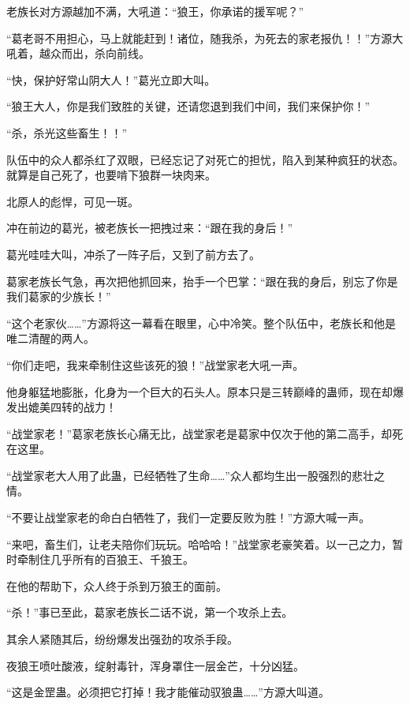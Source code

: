 
\begin{this_body}

老族长对方源越加不满，大吼道：“狼王，你承诺的援军呢？”

“葛老哥不用担心，马上就能赶到！诸位，随我杀，为死去的家老报仇！！”方源大吼着，越众而出，杀向前线。

“快，保护好常山阴大人！”葛光立即大叫。

“狼王大人，你是我们致胜的关键，还请您退到我们中间，我们来保护你！”

“杀，杀光这些畜生！！”

队伍中的众人都杀红了双眼，已经忘记了对死亡的担忧，陷入到某种疯狂的状态。就算是自己死了，也要啃下狼群一块肉来。

北原人的彪悍，可见一斑。

冲在前边的葛光，被老族长一把拽过来：“跟在我的身后！”

葛光哇哇大叫，冲杀了一阵子后，又到了前方去了。

葛家老族长气急，再次把他抓回来，抬手一个巴掌：“跟在我的身后，别忘了你是我们葛家的少族长！”

“这个老家伙……”方源将这一幕看在眼里，心中冷笑。整个队伍中，老族长和他是唯二清醒的两人。

“你们走吧，我来牵制住这些该死的狼！”战堂家老大吼一声。

他身躯猛地膨胀，化身为一个巨大的石头人。原本只是三转巅峰的蛊师，现在却爆发出媲美四转的战力！

“战堂家老！”葛家老族长心痛无比，战堂家老是葛家中仅次于他的第二高手，却死在这里。

“战堂家老大人用了此蛊，已经牺牲了生命……”众人都均生出一股强烈的悲壮之情。

“不要让战堂家老的命白白牺牲了，我们一定要反败为胜！”方源大喊一声。

“来吧，畜生们，让老夫陪你们玩玩。哈哈哈！”战堂家老豪笑着。以一己之力，暂时牵制住几乎所有的百狼王、千狼王。

在他的帮助下，众人终于杀到万狼王的面前。

“杀！”事已至此，葛家老族长二话不说，第一个攻杀上去。

其余人紧随其后，纷纷爆发出强劲的攻杀手段。

夜狼王喷吐酸液，绽射毒针，浑身罩住一层金芒，十分凶猛。

“这是金罡蛊。必须把它打掉！我才能催动驭狼蛊……”方源大叫道。


\end{this_body}
